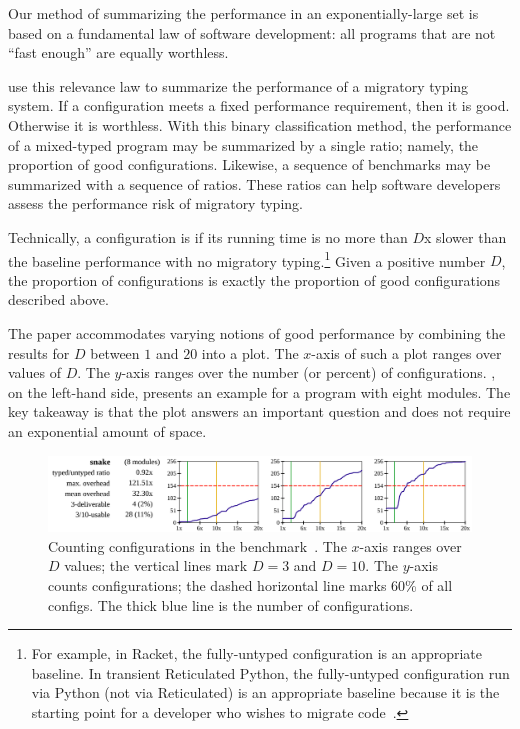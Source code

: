 Our method of summarizing the performance in an exponentially-large set
 is based on a fundamental law of software development:
 all programs that are not ``fast enough'' are equally worthless.

\citet{tfgnvf-popl-2016} use this relevance law to summarize the performance
 of a migratory typing system.
If a configuration meets a fixed performance requirement, then it is good.
Otherwise it is worthless.
With this binary classification method, the performance of a mixed-typed
 program may be summarized by a single ratio; namely,
 the proportion of good configurations.
Likewise, a sequence of benchmarks may be summarized with a sequence of ratios.
These ratios can help software developers assess the performance risk of
 migratory typing.

Technically, a configuration is 
 if its running time is no more than $D$x slower than the baseline performance
 with no migratory typing.\footnote{For example, in Racket, the fully-untyped configuration
 is an appropriate baseline. In transient Reticulated Python, the fully-untyped configuration
 run via Python (not via Reticulated) is an appropriate baseline because it is the starting
 point for a developer who wishes to migrate code~\cite{gm-pepm-2018}.}
Given a positive number $D$, the proportion of  configurations
 is exactly the proportion of good configurations described above.

The paper accommodates varying notions of good performance by combining the
 results for $D$ between $1$ and $20$ into a plot.
The $x$-axis of such a plot ranges over values of $D$.
The $y$-axis ranges over the number (or percent) of configurations.
, on the left-hand side, presents an example
 for a program with eight modules.
The key takeaway is that the plot answers an important question and does
 not require an exponential amount of space.

\begin{figure}[h]
\includegraphics[width=0.96\columnwidth]{src/snake-popl.png}
\caption{Counting  configurations in the 
         benchmark~\cite{tfgnvf-popl-2016}. The $x$-axis ranges over $D$ values;
         the vertical lines mark $D=3$ and $D=10$.
         The $y$-axis counts configurations; the dashed horizontal line marks
         $60$\% of all configs.
         The thick blue line is the number of  configurations.}
\label{fig:snake-popl}
\end{figure}

